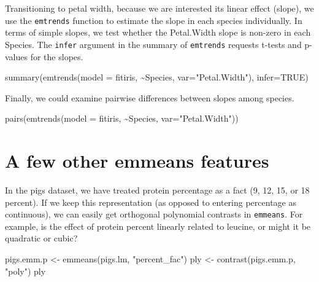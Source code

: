\documentclass[
]{book}
\newenvironment{Shaded}{\begin{snugshade}}{\end{snugshade}}
\newcommand{\AttributeTok}[1]{\textcolor[rgb]{0.77,0.63,0.00}{#1}}
\newcommand{\ConstantTok}[1]{\textcolor[rgb]{0.00,0.00,0.00}{#1}}
\newcommand{\FunctionTok}[1]{\textcolor[rgb]{0.00,0.00,0.00}{#1}}
\newcommand{\NormalTok}[1]{#1}
\newcommand{\OtherTok}[1]{\textcolor[rgb]{0.56,0.35,0.01}{#1}}
\newcommand{\SpecialCharTok}[1]{\textcolor[rgb]{0.00,0.00,0.00}{#1}}
\newcommand{\StringTok}[1]{\textcolor[rgb]{0.31,0.60,0.02}{#1}}
\begin{document}
Transitioning to petal width, because we are interested its linear effect (slope), we use the \texttt{emtrends} function to estimate the slope in each species individually. In terms of simple slopes, we test whether the Petal.Width slope is non-zero in each Species. The \texttt{infer} argument in the summary of \texttt{emtrends} requests t-tests and p-values for the slopes.

\begin{Shaded}
\begin{Highlighting}[]
\FunctionTok{summary}\NormalTok{(}\FunctionTok{emtrends}\NormalTok{(}\AttributeTok{model =}\NormalTok{ fitiris, }\SpecialCharTok{\textasciitilde{}}\NormalTok{Species, }\AttributeTok{var=}\StringTok{"Petal.Width"}\NormalTok{), }\AttributeTok{infer=}\ConstantTok{TRUE}\NormalTok{)}
\end{Highlighting}
\end{Shaded}

Finally, we could examine pairwise differences between slopes among species.

\begin{Shaded}
\begin{Highlighting}[]
\FunctionTok{pairs}\NormalTok{(}\FunctionTok{emtrends}\NormalTok{(}\AttributeTok{model =}\NormalTok{ fitiris, }\SpecialCharTok{\textasciitilde{}}\NormalTok{Species, }\AttributeTok{var=}\StringTok{"Petal.Width"}\NormalTok{))}
\end{Highlighting}
\end{Shaded}

\hypertarget{a-few-other-emmeans-features}{%
\section{A few other emmeans features}\label{a-few-other-emmeans-features}}

In the pigs dataset, we have treated protein percentage as a fact (9, 12, 15, or 18 percent). If we keep this representation (as opposed to entering percentage as continuous), we can easily get orthogonal polynomial contrasts in \texttt{emmeans}. For example, is the effect of protein percent linearly related to leucine, or might it be quadratic or cubic?

\begin{Shaded}
\begin{Highlighting}[]
\NormalTok{pigs.emm.p }\OtherTok{\textless{}{-}} \FunctionTok{emmeans}\NormalTok{(pigs.lm, }\StringTok{"percent\_fac"}\NormalTok{)}
\NormalTok{ply }\OtherTok{\textless{}{-}} \FunctionTok{contrast}\NormalTok{(pigs.emm.p, }\StringTok{"poly"}\NormalTok{)}
\NormalTok{ply}
\end{Highlighting}
\end{Shaded}
\end{document}
